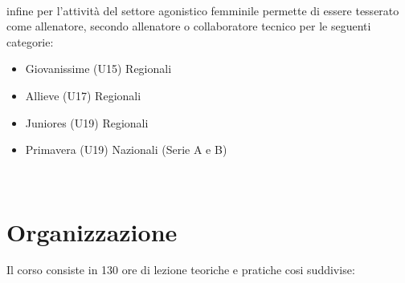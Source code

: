 \documentclass[../uefaC.tex]{subfiles}
\begin{document}
\hfill \\
infine per l'attività del settore agonistico femminile permette di essere tesserato come allenatore, secondo allenatore o collaboratore tecnico per le seguenti categorie:
\begin{itemize}
    \item Giovanissime (U15) Regionali
    \item Allieve (U17) Regionali
    \item Juniores (U19) Regionali
    \item Primavera (U19) Nazionali (Serie A e B)
\end{itemize}
\hfill \\

\section{Organizzazione}
Il corso consiste in 130 ore di lezione teoriche e pratiche cosi suddivise: \hfill \\
\end{document}
